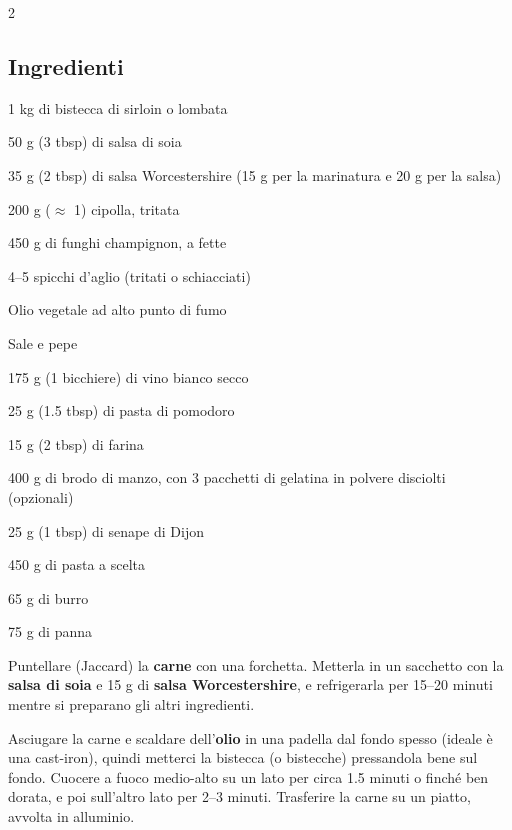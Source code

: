 \newpage
{}
\vspace*{-0.5 cm}
\begin{multicols}{2}
	\subsection*{Ingredienti}
	\begin{ingredients}
		\item 1 kg di bistecca di sirloin o lombata
		\item 50 g (3 tbsp) di salsa di soia
		\item 35 g (2 tbsp) di salsa Worcestershire (15 g per la marinatura e 20 g per la salsa)
		\item 200 g ($\approx$ 1) cipolla, tritata
		\item 450 g di funghi champignon, a fette
		\item 4--5 spicchi d'aglio (tritati o schiacciati)
		\item Olio vegetale ad alto punto di fumo
		\item Sale e pepe
		\item 175 g (1 bicchiere) di vino bianco secco
		\item 25 g (1.5 tbsp) di pasta di pomodoro
		\item 15 g (2 tbsp) di farina
		\item 400 g di brodo di manzo, con 3 pacchetti di gelatina in polvere disciolti (opzionali)
		\item 25 g (1 tbsp) di senape di Dijon
		\item 450 g di pasta a scelta
		\item 65 g di burro
		\item 75 g di panna
	\end{ingredients}

\end{multicols}

\vspace*{-0.3cm}

Puntellare (Jaccard) la \textbf{carne} con una forchetta.
Metterla in un sacchetto con la \textbf{salsa di soia} e 15 g di \textbf{salsa Worcestershire}, e refrigerarla per 15--20 minuti mentre si preparano gli altri ingredienti.

Asciugare la carne e scaldare dell'\textbf{olio} in una padella dal fondo spesso (ideale è una cast-iron), quindi metterci la bistecca (o bistecche) pressandola bene sul fondo. 
Cuocere a fuoco medio-alto su un lato per circa 1.5 minuti o finché ben dorata, e poi sull'altro lato per 2--3 minuti.
Trasferire la carne su un piatto, avvolta in alluminio.

